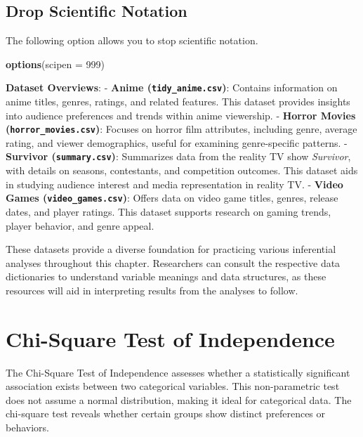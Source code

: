 \documentclass[
]{book}
\newenvironment{Shaded}{\begin{snugshade}}{\end{snugshade}}
\newcommand{\AttributeTok}[1]{\textcolor[rgb]{0.13,0.29,0.53}{#1}}
\newcommand{\DecValTok}[1]{\textcolor[rgb]{0.00,0.00,0.81}{#1}}
\newcommand{\FunctionTok}[1]{\textcolor[rgb]{0.13,0.29,0.53}{\textbf{#1}}}
\newcommand{\NormalTok}[1]{#1}
\begin{document}
\subsection*{Drop Scientific Notation}\label{drop-scientific-notation}

The following option allows you to stop scientific notation.

\begin{Shaded}
\begin{Highlighting}[]
\FunctionTok{options}\NormalTok{(}\AttributeTok{scipen =} \DecValTok{999}\NormalTok{) }
\end{Highlighting}
\end{Shaded}

\textbf{Dataset Overviews}:
- \textbf{Anime (\texttt{tidy\_anime.csv})}: Contains information on anime titles, genres, ratings, and related features. This dataset provides insights into audience preferences and trends within anime viewership.
- \textbf{Horror Movies (\texttt{horror\_movies.csv})}: Focuses on horror film attributes, including genre, average rating, and viewer demographics, useful for examining genre-specific patterns.
- \textbf{Survivor (\texttt{summary.csv})}: Summarizes data from the reality TV show \emph{Survivor}, with details on seasons, contestants, and competition outcomes. This dataset aids in studying audience interest and media representation in reality TV.
- \textbf{Video Games (\texttt{video\_games.csv})}: Offers data on video game titles, genres, release dates, and player ratings. This dataset supports research on gaming trends, player behavior, and genre appeal.

These datasets provide a diverse foundation for practicing various inferential analyses throughout this chapter. Researchers can consult the respective data dictionaries to understand variable meanings and data structures, as these resources will aid in interpreting results from the analyses to follow.

\section{Chi-Square Test of Independence}\label{chi-square-test-of-independence}

The Chi-Square Test of Independence assesses whether a statistically significant association exists between two categorical variables. This non-parametric test does not assume a normal distribution, making it ideal for categorical data. The chi-square test reveals whether certain groups show distinct preferences or behaviors.
\end{document}
